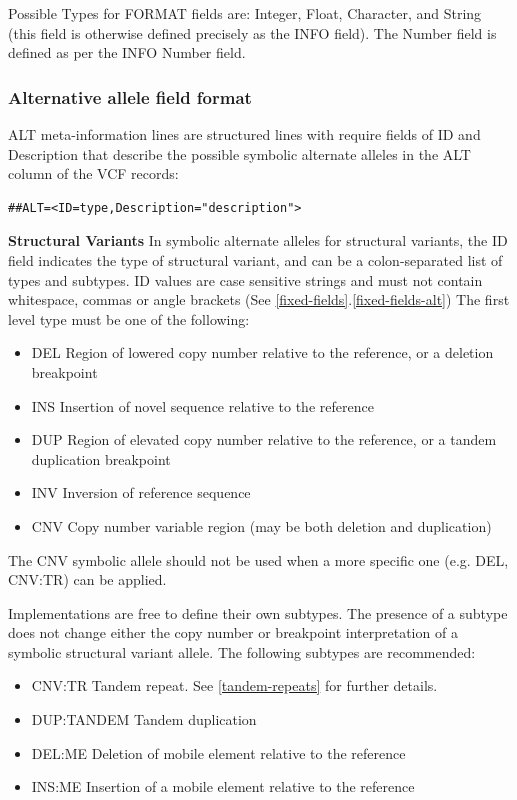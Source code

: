 \documentclass[8pt]{article}
\begin{document}
Possible Types for FORMAT fields are: Integer, Float, Character, and String (this field is otherwise defined precisely as the INFO field).
The Number field is defined as per the INFO Number field.

\subsubsection{Alternative allele field format} \label{altfield}
ALT meta-information lines are structured lines with require fields of ID and Description that describe the possible symbolic alternate alleles in the ALT column of the VCF records:

\begin{verbatim}
##ALT=<ID=type,Description="description">
\end{verbatim}

\noindent \textbf{Structural Variants} \newline
In symbolic alternate alleles for structural variants, the ID field indicates the type of structural variant, and can be a colon-separated list of types and subtypes.
ID values are case sensitive strings and must not contain whitespace, commas or angle brackets (See \ref{fixed-fields}.\ref{fixed-fields-alt})
The first level type must be one of the following:
\begin{itemize}
  \item DEL Region of lowered copy number relative to the reference, or a deletion breakpoint
  \item INS Insertion of novel sequence relative to the reference
  \item DUP Region of elevated copy number relative to the reference, or a tandem duplication breakpoint
  \item INV Inversion of reference sequence
  \item CNV Copy number variable region (may be both deletion and duplication)
\end{itemize}

The CNV symbolic allele should not be used when a more specific one (e.g. DEL, CNV:TR) can be applied.

Implementations are free to define their own subtypes.
The presence of a subtype does not change either the copy number or breakpoint interpretation of a symbolic structural variant allele.
The following subtypes are recommended:
\begin{itemize}
  \item CNV:TR Tandem repeat. See \ref{tandem-repeats} for further details.
  \item DUP:TANDEM Tandem duplication
  \item DEL:ME Deletion of mobile element relative to the reference
  \item INS:ME Insertion of a mobile element relative to the reference
\end{itemize}
\end{document}
